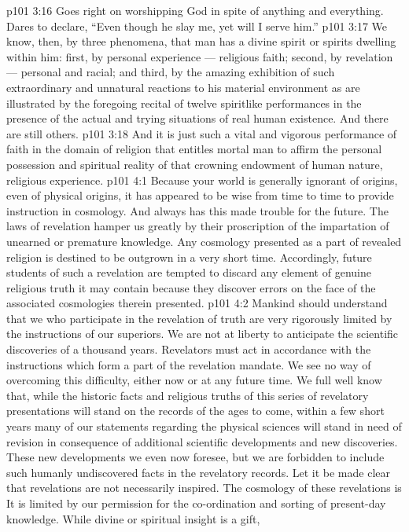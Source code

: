 \vs p101 3:16 \bibnobreakspace Goes right on worshipping God in spite of anything and everything. Dares to declare, “Even though he slay me, yet will I serve him.”
\vs p101 3:17 \pc We know, then, by three phenomena, that man has a divine spirit or spirits dwelling within him: first, by personal experience --- religious faith; second, by revelation --- personal and racial; and third, by the amazing exhibition of such extraordinary and unnatural reactions to his material environment as are illustrated by the foregoing recital of twelve spiritlike performances in the presence of the actual and trying situations of real human existence. And there are still others.
\vs p101 3:18 And it is just such a vital and vigorous performance of faith in the domain of religion that entitles mortal man to affirm the personal possession and spiritual reality of that crowning endowment of human nature, religious experience.
\vs p101 4:1 Because your world is generally ignorant of origins, even of physical origins, it has appeared to be wise from time to time to provide instruction in cosmology. And always has this made trouble for the future. The laws of revelation hamper us greatly by their proscription of the impartation of unearned or premature knowledge. Any cosmology presented as a part of revealed religion is destined to be outgrown in a very short time. Accordingly, future students of such a revelation are tempted to discard any element of genuine religious truth it may contain because they discover errors on the face of the associated cosmologies therein presented.
\vs p101 4:2 Mankind should understand that we who participate in the revelation of truth are very rigorously limited by the instructions of our superiors. We are not at liberty to anticipate the scientific discoveries of a thousand years. Revelators must act in accordance with the instructions which form a part of the revelation mandate. We see no way of overcoming this difficulty, either now or at any future time. We full well know that, while the historic facts and religious truths of this series of revelatory presentations will stand on the records of the ages to come, within a few short years many of our statements regarding the physical sciences will stand in need of revision in consequence of additional scientific developments and new discoveries. These new developments we even now foresee, but we are forbidden to include such humanly undiscovered facts in the revelatory records. Let it be made clear that revelations are not necessarily inspired. The cosmology of these revelations is  It is limited by our permission for the co\hyp{}ordination and sorting of present\hyp{}day knowledge. While divine or spiritual insight is a gift, 
